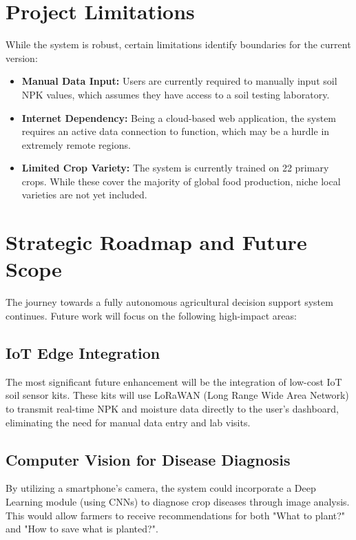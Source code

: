 \documentclass[12pt,a4paper]{report}
\begin{document}
\section{Project Limitations}
While the system is robust, certain limitations identify boundaries for the current version:
\begin{itemize}
    \item \textbf{Manual Data Input:} Users are currently required to manually input soil NPK values, which assumes they have access to a soil testing laboratory.
    \item \textbf{Internet Dependency:} Being a cloud-based web application, the system requires an active data connection to function, which may be a hurdle in extremely remote regions.
    \item \textbf{Limited Crop Variety:} The system is currently trained on 22 primary crops. While these cover the majority of global food production, niche local varieties are not yet included.
\end{itemize}

\section{Strategic Roadmap and Future Scope}
The journey towards a fully autonomous agricultural decision support system continues. Future work will focus on the following high-impact areas:

\subsection{IoT Edge Integration}
The most significant future enhancement will be the integration of low-cost IoT soil sensor kits. These kits will use LoRaWAN (Long Range Wide Area Network) to transmit real-time NPK and moisture data directly to the user's dashboard, eliminating the need for manual data entry and lab visits.

\subsection{Computer Vision for Disease Diagnosis}
By utilizing a smartphone's camera, the system could incorporate a Deep Learning module (using CNNs) to diagnose crop diseases through image analysis. This would allow farmers to receive recommendations for both "What to plant?" and "How to save what is planted?".
\end{document}

